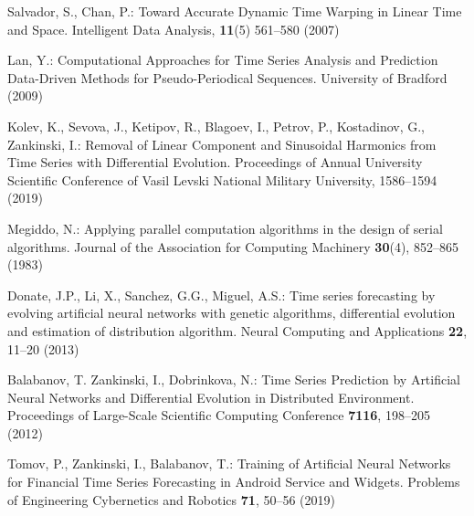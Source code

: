 \documentclass[runningheads]{llncs}
\begin{document}
\begin{thebibliography}{8}
 Salvador, S., Chan, P.: Toward Accurate Dynamic Time Warping in Linear Time and Space. Intelligent Data Analysis, \textbf{11}(5) 561--580 (2007)

 Lan, Y.: Computational Approaches for Time Series Analysis and Prediction Data-Driven Methods for Pseudo-Periodical Sequences. University of Bradford (2009)

 Kolev, K., Sevova, J., Ketipov, R., Blagoev, I., Petrov, P., Kostadinov, G., Zankinski, I.: Removal of Linear Component and Sinusoidal Harmonics from Time Series with Differential Evolution. Proceedings of Annual University Scientific Conference of Vasil Levski National Military University, 1586--1594 (2019)

 Megiddo, N.: Applying parallel computation algorithms in the design of serial algorithms. Journal of the Association for Computing Machinery \textbf{30}(4), 852--865 (1983)

 Donate, J.P., Li, X., Sanchez, G.G., Miguel, A.S.: Time series forecasting by evolving artificial neural networks with genetic algorithms, differential evolution and estimation of distribution algorithm. Neural Computing and Applications \textbf{22}, 11--20 (2013)

 Balabanov, T. Zankinski, I., Dobrinkova, N.: Time Series Prediction by Artificial Neural Networks and Differential Evolution in Distributed Environment. Proceedings of Large-Scale Scientific Computing Conference \textbf{7116}, 198--205 (2012)

  Tomov, P., Zankinski, I., Balabanov, T.: Training of Artificial Neural Networks for Financial Time Series Forecasting in Android Service and Widgets. Problems of Engineering Cybernetics and Robotics \textbf{71}, 50--56 (2019)

\end{thebibliography}
\end{document}
